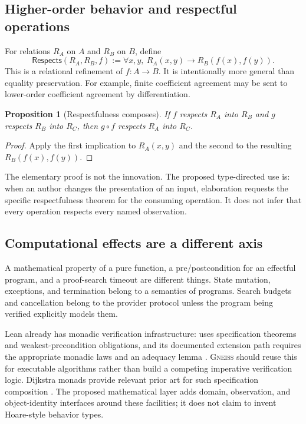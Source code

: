 \documentclass[11pt,letterpaper]{article}
\newcommand{\code}[1]{\texttt{\detokenize{#1}}}
\newcommand{\Gneiss}{\textsc{Gneiss}}
\newcommand{\Respects}{\mathsf{Respects}}
\newtheorem{proposition}[theorem]{Proposition}
\theoremstyle{definition}
\theoremstyle{remark}
\begin{document}
\subsection{Higher-order behavior and respectful operations}
For relations $R_A$ on $A$ and $R_B$ on $B$, define
\[
 \Respects(R_A,R_B,f)
 :=\forall x,y,\ R_A(x,y)\to R_B(f(x),f(y)).
\]
This is a relational refinement of $f:A\to B$. It is intentionally more general
than equality preservation. For example, finite coefficient agreement may be
sent to lower-order coefficient agreement by differentiation.

\begin{proposition}[Respectfulness composes]
If $f$ respects $R_A$ into $R_B$ and $g$ respects $R_B$ into $R_C$, then
$g\circ f$ respects $R_A$ into $R_C$.
\end{proposition}
\begin{proof}
Apply the first implication to $R_A(x,y)$ and the second to the resulting
$R_B(f(x),f(y))$.
\end{proof}

The elementary proof is not the innovation. The proposed type-directed use is:
when an author changes the presentation of an input, elaboration requests the
specific respectfulness theorem for the consuming operation. It does not infer
that every operation respects every named observation.

\subsection{Computational effects are a different axis}
A mathematical property of a pure function, a pre/postcondition for an effectful
program, and a proof-search timeout are different things. State mutation,
exceptions, and termination belong to a semantics of programs. Search budgets
and cancellation belong to the provider protocol unless the program being
verified explicitly models them.

Lean already has monadic verification infrastructure: \code{mvcgen} uses
specification theorems and weakest-precondition obligations, and its documented
extension path requires the appropriate monadic laws and an adequacy lemma
\cite{lean-mvcgen,lean-mvcgen-enabling}. \Gneiss{} should reuse this for executable
algorithms rather than build a competing imperative verification logic. Dijkstra
monads provide relevant prior art for such specification composition
\cite{dm4free}. The proposed mathematical layer adds domain, observation, and
object-identity interfaces around these facilities; it does not claim to invent
Hoare-style behavior types.
\end{document}
